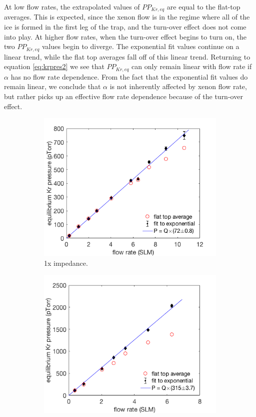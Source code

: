\documentclass[12pt]{article}
\begin{document}
At low flow rates, the extrapolated values of $PP_{Kr,eq}$ are equal to the flat-top averages. This is expected, since the xenon flow is in the regime where all of the ice is formed in the first leg of the trap, and the turn-over effect does not come into play. At higher flow rates, when the turn-over effect begins to turn on, the two $PP_{Kr,eq}$ values begin to diverge. The exponential fit values continue on a linear trend, while the flat top averages fall off of this linear trend. Returning to equation \ref{eq:krpres2} we see that $PP_{Kr,eq}$ can only remain linear with flow rate if $\alpha$ has no flow rate dependence. From the fact that the exponential fit values do remain linear, we conclude that $\alpha$ is not inherently affected by xenon flow rate, but rather picks up an effective flow rate dependence because of the turn-over effect.
\begin{figure}[h!]
\centering
\begin{subfigure}{0.5\textwidth}
  \centering
  \includegraphics[width=\textwidth]{Figures/SLAC_FlowResponse_1x_linfit.png}
  \caption{1x impedance.}
  \label{fig:flowresponse1x}
\end{subfigure}%
\begin{subfigure}{0.5\textwidth}
  \centering
  \includegraphics[width=\textwidth]{Figures/SLAC_FlowResponse_15x_linplot.png}

\end{subfigure}
\end{figure}
\end{document}
